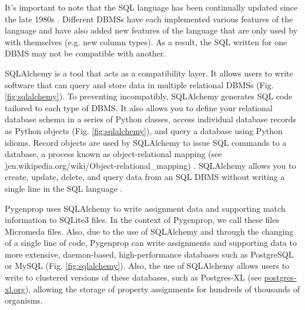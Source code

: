 It's important to note that the SQL language has been continually updated since the late 1980s \cite{sql1987guide, ISO9075}. Different DBMSs have each implemented various features of the language and have also added new features of the language that are only used by with themselves (e.g. new column types). As a result, the SQL written for one DBMS may not be compatible with another. 

SQLAlchemy \cite{bayer2014sqlalchemy} is a tool that acts as a compatibility layer. It allows users to write software that can query and store data in multiple relational DBMSs (Fig. \ref{fig:sqlalchemy}). To preventing incompatibly, SQLAlchemy generates SQL code tailored to each type of DBMS. It also allows you to define your relational database schema in a series of Python classes, access individual database records as Python objects (Fig. \ref{fig:sqlalchemy}), and query a database using Python idioms. Record objects are used by SQLAlchemy to issue SQL commands to a database, a process known as object-relational mapping \cite{ambler2000mapping,bayer2014sqlalchemy} (see \href{https://en.wikipedia.org/wiki/Object-relational\_mapping}){en.wikipedia.org/wiki/Object-relational\_mapping}) \cite{o2008object}. SQLAlchemy allows you to create, update, delete, and query data from an SQL DBMS without writing a single line in the SQL language \cite{bayer2014sqlalchemy}.

Pygenprop uses SQLAlchemy to write assignment data and supporting match information to SQLite3 files. In the context of Pygenprop, we call these files Micromeda files. Also, due to the use of SQLAlchemy and through the changing of a single line of code, Pygenprop can write assignments and supporting data to more extensive, daemon-based, high-performance databases such as PostgreSQL or MySQL (Fig. \ref{fig:sqlalchemy}). Also, the use of SQLAlchemy allows users to write to clustered versions of these databases, such as Postgres-XL (see \href{www.postgres-xl.org}{postgres-xl.org}), allowing the storage of property assignments for hundreds of thousands of organisms.


